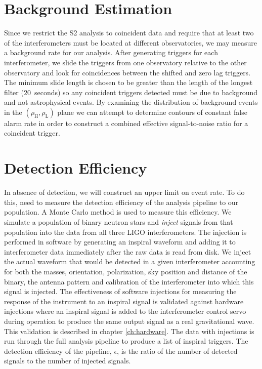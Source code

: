 \section{Background Estimation}
\label{s:background}

Since we restrict the S2 analysis to coincident data and require that at least
two of the interferometers must be located at different observatories, we may
measure a background rate for our analysis. After generating triggers for each
interferometer, we slide the triggers from one observatory relative to the
other observatory and look for coincidences between the shifted and zero lag
triggers. The minimum slide length is chosen to be greater than the length of
the longest filter ($20$~seconds) so any coincident triggers detected must be due to background and
not astrophysical events. By examining the distribution of background events
in the $(\rho_\mathrm{H},\rho_\mathrm{L})$ plane we can attempt to determine
contours of constant false alarm rate in order to construct a combined
effective signal-to-noise ratio for a coincident trigger\cite{abbott2004a}.

\section{Detection Efficiency}
\label{s:eff}

In absence of detection, we will construct an upper limit on event rate.  To
do this, need to measure the detection efficiency of the analysis pipeline to
our population. A Monte Carlo method is used to measure this efficiency. We
simulate a population of binary neutron stars and \emph{inject} signals from
that population into the data from all three LIGO interferometers. The
injection is performed in software by generating an inspiral waveform and
adding it to interferometer data immediately after the raw data is read from
disk. We inject the actual waveform that would be detected in a given
interferometer accounting for both the masses, orientation, polarization, sky
position and distance of the binary, the antenna pattern and calibration of
the interferometer into which this signal is injected.  The effectiveness of
software injections for measuring the response of the instrument to an
inspiral signal is validated against hardware injections where
an inspiral signal is added to the interferometer control servo during
operation to produce the same output signal as a real gravitational wave. This
validation is described in chapter \ref{ch:hardware}. The
data with injections is run through the full analysis pipeline to produce a
list of inspiral triggers. The detection efficiency of the pipeline,
$\epsilon$, is the ratio of the number of detected signals to the number of
injected signals.

